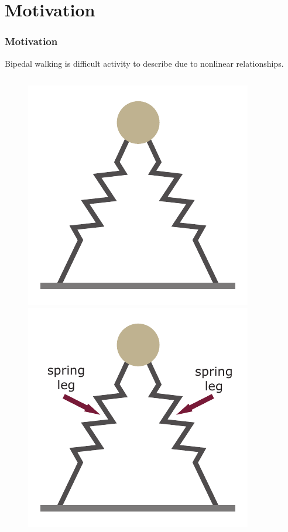 \graphicspath{{images/motivation/}}
\section{Motivation}
\begin{frame}
	\frametitle{Motivation}
	Bipedal walking is difficult activity to describe due to nonlinear relationships.
	\begin{columns}
	\begin{column}{0.35\textwidth}
		\begin{figure}
		\begin{overprint}
			\includegraphics[width=.9\textwidth]{double_SLIP.pdf}
			\onslide<2>\includegraphics[width=.9\textwidth]{double_SLIP_spring_leg.pdf}

\end{overprint}
\end{figure}
\end{column}
\end{columns}
\end{frame}

